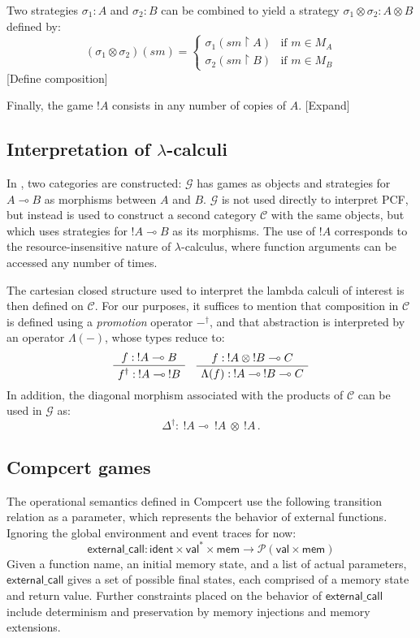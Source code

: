 \documentclass[acmsmall,anonymous]{acmart}
\newcommand{\kw}[1]{\ensuremath{ \textsf{#1} }}
\begin{document}
Two strategies $\sigma_1 : A$ and $\sigma_2 : B$
can be combined to yield a strategy $\sigma_1 \otimes \sigma_2 : A \otimes B$
defined by:
\[
    (\sigma_1 \otimes \sigma_2)(sm) =
      \begin{cases}
        \sigma_1(sm \upharpoonright A) & \mbox{if } m \in M_A \\
        \sigma_2(sm \upharpoonright B) & \mbox{if } m \in M_B
      \end{cases}
\]
[Define composition]

Finally, the game $!A$ consists in any number of copies of $A$.
[Expand]


\subsection{Interpretation of $\lambda$-calculi} %

In \citep{gamesem99},
two categories are constructed:
$\mathcal{G}$ has games as objects
and strategies for $A \multimap B$
as morphisms between $A$ and $B$.
$\mathcal{G}$ is not used directly to interpret PCF,
but instead is used to construct a second category
$\mathcal{C}$ with the same objects,
but which uses strategies for $!A \multimap B$
as its morphisms.
The use of $!A$ corresponds to the resource-insensitive nature
of $\lambda$-calculus,
where function arguments can be accessed
any number of times.

The cartesian closed structure used to interpret
the lambda calculi of interest
is then defined on $\mathcal{C}$.
For our purposes,
it suffices to mention that
composition in $\mathcal{C}$ is defined using
a \emph{promotion} operator $-^\dagger$,
and that abstraction
is interpreted by an operator $\Lambda(-)$,
whose types reduce to:
\[
  \AxiomC{$f : \: !A \multimap B$}
  \UnaryInfC{$f^\dagger : \: !A \multimap \: !B$}
  \DisplayProof
  \quad
  \AxiomC{$f : \: !A \: \otimes \: !B \multimap C$}
  \UnaryInfC{$\Lambda(f) : \: !A \multimap \: !B \multimap C$}
  \DisplayProof
\]
In addition,
the diagonal morphism associated with the products of $\mathcal{C}$
can be used in $\mathcal{G}$ as:
\[
  \Delta^\dagger : \: !A \multimap \: !A \: \otimes \: !A \,.
\]


\subsection{Compcert games} %

The operational semantics defined in Compcert
use the following transition relation as a parameter,
which represents the behavior of external functions.
Ignoring the global environment and event traces for now:
\[
  \kw{external\_call} :
    \kw{ident} \times \kw{val}^* \times \kw{mem} \rightarrow
    \mathcal{P}(\kw{val} \times \kw{mem})
\]
Given a function name,
an initial memory state,
and a list of actual parameters,
$\kw{external\_call}$ gives a set of possible final states,
each comprised of a memory state and return value.
Further constraints placed on the behavior of
\kw{external\_call} include determinism
and preservation by memory injections and memory extensions.
\end{document}
